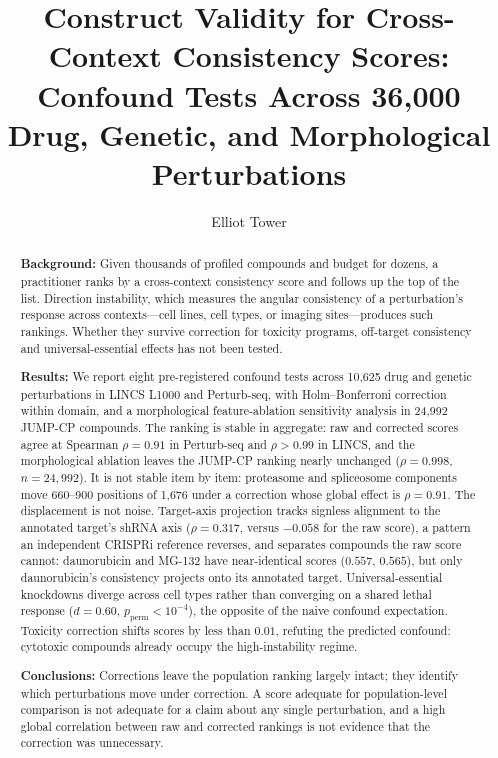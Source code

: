 \documentclass[11pt]{article}
\title{Construct Validity for Cross-Context Consistency Scores:\\ Confound Tests Across 36,000 Drug, Genetic, and Morphological Perturbations}
\author{Elliot Tower}
\affil{\texttt{elliot@elliottower.ai}}
\date{}
\begin{document}
\maketitle

\begin{abstract}
\textbf{Background:}
Given thousands of profiled compounds and budget for dozens, a practitioner
ranks by a cross-context consistency score and follows up the top of the
list. Direction instability, which measures the angular consistency of a
perturbation's response across contexts---cell lines, cell types, or
imaging sites---produces such rankings.
Whether they survive correction for toxicity programs, off-target
consistency and universal-essential effects has not been tested.

\textbf{Results:}
We report eight pre-registered confound tests across 10{,}625 drug and
genetic perturbations in LINCS L1000 and Perturb-seq, with
Holm--Bonferroni correction within domain, and a morphological
feature-ablation sensitivity analysis in 24{,}992 JUMP-CP compounds.
The ranking is stable in aggregate: raw and corrected scores agree at
Spearman $\rho = 0.91$ in Perturb-seq and $\rho > 0.99$ in LINCS, and the
morphological ablation leaves the JUMP-CP ranking nearly unchanged
($\rho = 0.998$, $n = 24{,}992$). It is
not stable item by item: proteasome and spliceosome components move
660--900 positions of 1{,}676 under a correction whose global effect is
$\rho = 0.91$. The displacement is not noise. Target-axis projection tracks signless
alignment to the annotated target's shRNA axis ($\rho = 0.317$, versus
$-0.058$ for the raw score), a pattern an independent CRISPRi reference
reverses, and separates compounds the raw score cannot: daunorubicin and MG-132 have
near-identical scores ($0.557$, $0.565$), but only daunorubicin's
consistency projects onto its annotated target. Universal-essential knockdowns
diverge across cell types rather than converging on a shared lethal response
($d = 0.60$, $p_{\text{perm}} < 10^{-4}$), the opposite of the naive confound
expectation. Toxicity correction shifts scores by less
than $0.01$, refuting the predicted confound: cytotoxic compounds already
occupy the high-instability regime.

\textbf{Conclusions:}
Corrections leave the population ranking largely intact; they identify
which perturbations move under correction. A score adequate
for population-level comparison is not adequate for a claim about any
single perturbation, and a high global correlation between raw
and corrected rankings is not evidence that the correction was
unnecessary.
\end{abstract}
\end{document}
